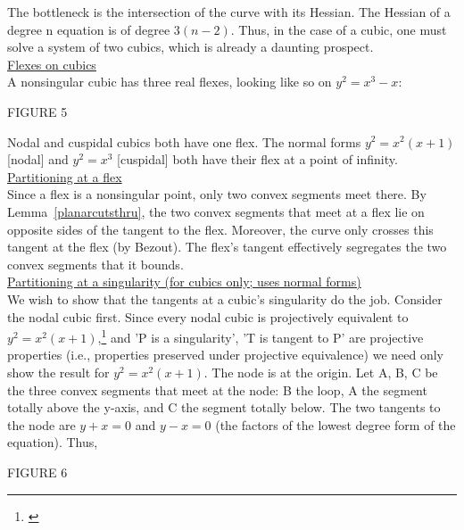 The bottleneck is the intersection of the curve with its Hessian.  
The Hessian of a degree n equation is of degree $3(n-2)$.
Thus, in the case of a cubic, one must solve a system of two cubics,
which is already a daunting prospect.\vspace{.25in} \\
\underline{Flexes on cubics}\vspace{.25in} \\
A nonsingular cubic has  three real flexes, looking like so on
$y^{2} = x^{3} - x$:
\begin{center}
FIGURE 5
\end{center}
Nodal and cuspidal cubics both have one flex.  The normal forms
$y^{2} = x^{2}(x+1)$ [nodal] and $y^{2} = x^{3}$ [cuspidal] both
have their flex at a point of infinity.\vspace{.25in} \\
\underline{Partitioning at a flex}\vspace{.25in} \\
Since a flex is a nonsingular point, only two convex segments meet there.
By Lemma~\ref{planarcutsthru}, the two convex segments that meet at a flex lie
on opposite sides of the tangent to the flex.
Moreover, the curve only crosses this tangent at the flex (by Bezout).
\hence The flex's tangent effectively segregates the two convex
segments that it bounds.\vspace{.25in} \\
\underline{Partitioning at a singularity (for cubics only; uses
normal forms)}\vspace{.25in} \\
We wish to show that the tangents at a cubic's singularity do the job.
Consider the nodal cubic first.
Since every nodal cubic is projectively equivalent to
$y^{2} = x^{2}(x+1)$,\footnote{\cite[p.\ 128]{namba}}
and 'P is a singularity',
'T is tangent to P' are projective properties (i.e., properties 
preserved under projective equivalence)
we need only show the result for $y^{2} = x^{2}(x+1)$.
The node is at the origin.  Let A, B, C be the three convex segments
that meet at the node: B the loop, A the segment totally above the 
y-axis,  and C the segment totally below.
The two tangents to the node are $y+x=0$ and $y-x=0$ (the factors
of the lowest degree form of the equation). Thus,\\
\begin{center}
FIGURE 6
\end{center}
